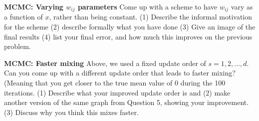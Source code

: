 \documentclass[11pt]{article}
\begin{document}
\begin{problem}{5} \textbf{MCMC: Varying $w_{ij}$ parameters}
Come up with a scheme to have $w_{ij}$ vary as a function of $x$, rather than being constant. (1) Describe the informal motivation for the scheme (2) describe formally what you have done (3) Give an image of the final results (4) list your final error, and how much this improves on the previous problem.
\end{problem}
  
\begin{problem}{5} \textbf{MCMC: Faster mixing}
Above, we used a fixed update order of $s=1,2,...,d$. Can you come up with a different update order that leads to faster mixing? (Meaning that you get closer to the true mean value of $0$ during the 100 iterations. (1) Describe what your improved update order is and (2) make another version of the same graph from Question 5, showing your improvement. (3) Discuss why you think this mixes faster.
\end{problem}
  
\end{document}
